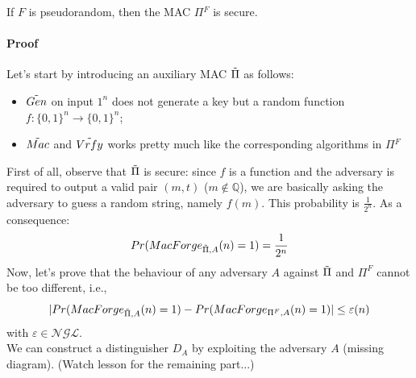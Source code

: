 \documentclass[../main]{subfiles}
\begin{document}
\begin{theorem}
    If $F$ is pseudorandom, then the MAC $\Pi{}^F$ is secure.
\end{theorem}

\paragraph{Proof}
Let's start by introducing an auxiliary MAC $\Tilde{\Pi}$ as follows:
\begin{itemize}
    \item $\Tilde{Gen}$ on input $1^n$ does not generate a key but a random function $f: \{0,1\}^n \rightarrow{} \{0,1\}^n$;
    \item $\Tilde{Mac}$ and $\Tilde{Vrfy}$ works pretty much like the corresponding algorithms in $\Pi{}^F$
\end{itemize}
First of all, observe that $\Tilde{\Pi}$ is secure: since $f$ is a function and the adversary is required to output a valid pair $(m,t)$ ($m \notin{} \mathbb{Q}$),
we are basically asking the adversary to guess a random string, namely $f(m)$. This probability is $\frac{1}{2^n}$.
As a consequence:
$$Pr(MacForge_{\Tilde{\Pi},A}(n) = 1) = \frac{1}{2^n}$$
Now, let's prove that the behaviour of any adversary $A$ against $\Tilde{\Pi}$ and $\Pi^F$ cannot be too different, i.e.,
$$|Pr(MacForge_{\Tilde{\Pi},A}(n) = 1) - Pr(MacForge_{\Pi^F,A}(n) = 1)| \le{} \varepsilon(n)$$
with $\varepsilon \in{} \mathcal{NGL}$.\\
We can construct a distinguisher $D_A$ by exploiting the adversary $A$ (missing diagram).
(Watch lesson for the remaining part...)
\end{document}
